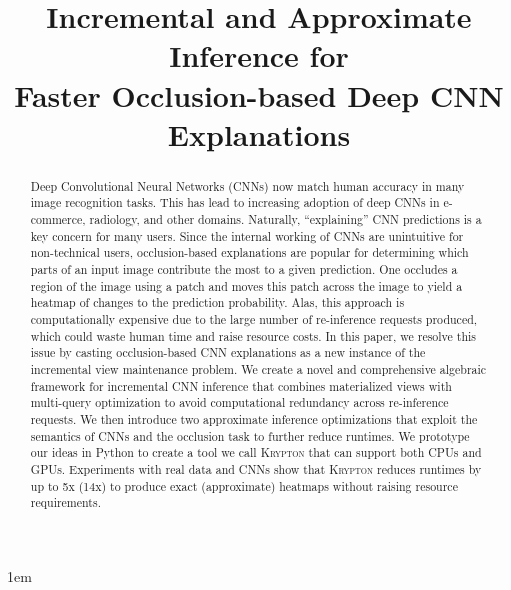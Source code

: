 \documentclass[10pt, sigconf]{acmart}
\begin{document}
\emergencystretch 1em

\title{Incremental and Approximate Inference for\\Faster Occlusion-based Deep CNN Explanations}



\begin{abstract}
Deep Convolutional Neural Networks (CNNs) now match human accuracy in many image recognition tasks. This has lead to increasing adoption of deep CNNs in e-commerce, radiology, and other domains. Naturally, ``explaining'' CNN predictions is a key concern for many users. Since the internal working of CNNs are unintuitive for non-technical users, occlusion-based explanations are popular for determining which parts of an input image contribute the most to a given prediction. One occludes a region of the image using a patch and moves this patch across the image to yield a heatmap of changes to the prediction probability. Alas, this approach is computationally expensive due to the large number of re-inference requests produced, which could waste human time and raise resource costs. In this paper, we resolve this issue by casting occlusion-based CNN explanations as a new instance of the incremental view maintenance problem. We create a novel and comprehensive algebraic framework for incremental CNN inference that combines materialized views with multi-query optimization to avoid computational redundancy across re-inference requests. We then introduce two approximate inference optimizations that exploit the semantics of CNNs and the occlusion task to further reduce runtimes. We prototype our ideas in Python to create a tool we call \textsc{Krypton} that can support both CPUs and GPUs. Experiments with real data and CNNs show that \textsc{Krypton} reduces runtimes by up to 5x (14x) to produce exact (approximate) heatmaps without raising resource requirements.
\end{abstract}

\maketitle



% 
\end{document}
